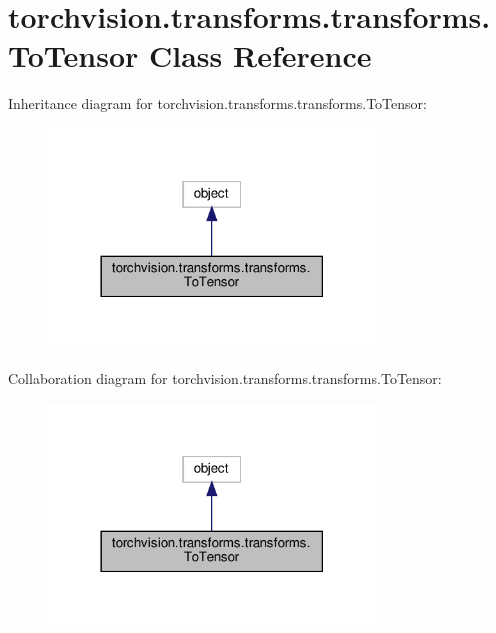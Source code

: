 \hypertarget{classtorchvision_1_1transforms_1_1transforms_1_1ToTensor}{}\section{torchvision.\+transforms.\+transforms.\+To\+Tensor Class Reference}
\label{classtorchvision_1_1transforms_1_1transforms_1_1ToTensor}


Inheritance diagram for torchvision.\+transforms.\+transforms.\+To\+Tensor\+:
\nopagebreak
\begin{figure}[H]
\begin{center}
\leavevmode
\includegraphics[width=246pt]{classtorchvision_1_1transforms_1_1transforms_1_1ToTensor__inherit__graph}
\end{center}
\end{figure}


Collaboration diagram for torchvision.\+transforms.\+transforms.\+To\+Tensor\+:
\nopagebreak
\begin{figure}[H]
\begin{center}
\leavevmode
\includegraphics[width=246pt]{classtorchvision_1_1transforms_1_1transforms_1_1ToTensor__coll__graph}
\end{center}
\end{figure}
